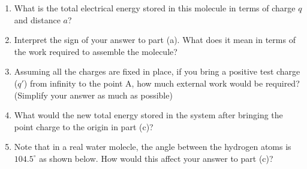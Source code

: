 \begin{enumerate}
    \item What is the total electrical energy stored in this molecule in terms of charge $q$ and distance $a$?
    \item Interpret the sign of your answer to part (a). What does it mean in terms of the work required to assemble the molecule?
    \item Assuming all the charges are fixed in place, if you bring a positive test charge ($q'$) from infinity to the point A, how much external work would be required?\\
    (Simplify your answer as much as possible)
    \item What would the new total energy stored in the system after bringing the point charge to the origin in part (c)?
    \item Note that in a real water molecle, the angle between the hydrogen atoms is $104.5^\circ$ as shown below. How would this affect your answer to part (c)?
    \begin{center}
    \end{center}
\end{enumerate}

